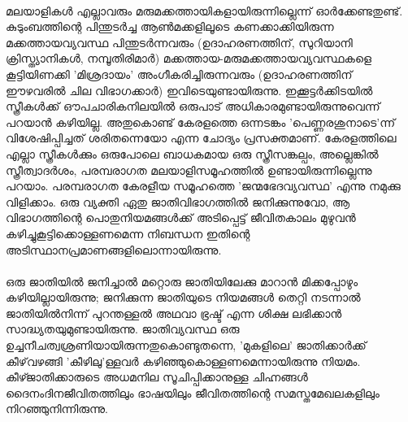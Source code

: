 \paragraph{}മലയാളികൾ എല്ലാവരും മരുമക്കത്തായികളായിരുന്നില്ലെന്ന് ഓർക്കേണ്ടതുണ്ട്. കുടുംബത്തിന്റെ പിന്തുടർച്ച ആൺമക്കളിലൂടെ കണക്കാക്കിയിരുന്ന മക്കത്തായവ്യവസ്ഥ പിന്തുടർന്നവരും (ഉദാഹരണത്തിന്, സുറിയാനി ക്രിസ്ത്യാനികൾ, നമ്പൂതിരിമാർ) മക്കത്തായ-മരുമക്കത്തായവ്യവസ്ഥകളെ കൂട്ടിയിണക്കി 'മിശ്രദായം' അംഗീകരിച്ചിരുന്നവരും (ഉദാഹരണത്തിന് ഈഴവരിൽ ചില വിഭാഗക്കാർ) ഇവിടെയുണ്ടായിരുന്നു. ഇക്കൂട്ടർക്കിടയിൽ സ്ത്രീകൾക്ക് ഔപചാരികനിലയിൽ ഒരുപാട് അധികാരമുണ്ടായിരുന്നുവെന്ന് പറയാൻ കഴിയില്ല. അതുകൊണ്ട് കേരളത്തെ ഒന്നടങ്കം 'പെണ്ണരശുനാടെ'ന്ന് വിശേഷിപ്പിച്ചത് ശരിതന്നെയോ എന്ന ചോദ്യം പ്രസക്തമാണ്. കേരളത്തിലെ എല്ലാ സ്ത്രീകൾക്കും ഒരുപോലെ ബാധകമായ ഒരു സ്ത്രീസങ്കല്പം, അല്ലെങ്കിൽ സ്ത്രീത്വാദർശം, പരമ്പരാഗത മലയാളിസമൂഹത്തിൽ ഉണ്ടായിരുന്നില്ലെന്നു പറയാം. പരമ്പരാഗത കേരളീയ സമൂഹത്തെ 'ജന്മഭേദവ്യവസ്ഥ' എന്നു നമുക്കു വിളിക്കാം. ഒരു വ്യക്തി ഏതു ജാതിവിഭാഗത്തിൽ ജനിക്കുന്നുവോ, ആ വിഭാഗത്തിന്റെ പൊതുനിയമങ്ങൾക്ക് അടിപ്പെട്ട് ജീവിതകാലം മുഴുവൻ കഴിച്ചുകൂട്ടിക്കൊള്ളണമെന്ന നിബന്ധന ഇതിന്റെ അടിസ്ഥാനപ്രമാണങ്ങളിലൊന്നായിരുന്നു.


\paragraph{}ഒരു ജാതിയിൽ ജനിച്ചാൽ മറ്റൊരു ജാതിയിലേക്കു മാറാൻ മിക്കപ്പോഴും കഴിയില്ലായിരുന്നു; ജനിക്കുന്ന ജാതിയുടെ നിയമങ്ങൾ തെറ്റി നടന്നാൽ ജാതിയിൽനിന്ന് പുറന്തള്ളൽ അഥവാ ഭ്രഷ്ട് എന്ന ശിക്ഷ ലഭിക്കാൻ സാദ്ധ്യതയുമുണ്ടായിരുന്നു. ജാതിവ്യവസ്ഥ ഒരു ഉച്ചനീചത്വശ്രണിയായിരുന്നതുകൊണ്ടുതന്നെ, 'മുകളിലെ' ജാതിക്കാർക്ക് കീഴ്‌വഴങ്ങി 'കീഴിലു'ള്ളവർ കഴിഞ്ഞുകൊള്ളണമെന്നായിരുന്നു നിയമം. കീഴ്ജാതിക്കാരുടെ അധമനില സൂചിപ്പിക്കാനുള്ള ചിഹ്നങ്ങൾ ദൈനംദിനജീവിതത്തിലും ഭാഷയിലും ജീവിതത്തിന്റെ സമസ്തമേഖലകളിലും നിറഞ്ഞുനിന്നിരുന്നു.

